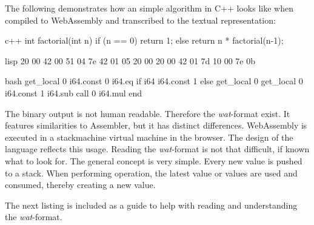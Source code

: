 The following demonstrates how an simple algorithm in C++ looks like when compiled to WebAssembly and transcribed to the textual representation:
\begin{listing}
\noindent
\begin{minipage}[t]{0.49\textwidth}
\begin{code}[]{c++}
int factorial(int n) {
  if (n == 0)
    return 1;
  else
    return n * factorial(n-1);
}
\end{code}
\end{minipage}
\begin{minipage}[t]{0.24\textwidth}
\begin{code}[]{lisp}
20 00
42 00
51
04 7e
42 01
05
20 00
20 00
42 01
7d
10 00
7e
0b
\end{code}
\end{minipage}
\begin{minipage}[t]{0.25\textwidth}
\begin{code}[]{bash}
get_local 0
i64.const 0
i64.eq
if i64
    i64.const 1
else
    get_local 0
    get_local 0
    i64.const 1
    i64.sub
    call 0
    i64.mul
end
\end{code}
\end{minipage}
\caption{C++ source code - Wasm format - Wat format \cite{wasm:wat}}
\label{lst:wasm-code}
\end{listing}

The binary output is not human readable. Therefore the \textit{wat}-format exist. It features similarities to Assembler, but it has distinct differences. WebAssembly is executed in a \gls{stackmachine} virtual machine in the browser. The design of the language reflects this usage. Reading the \textit{wat}-format is not that difficult, if known what to look for. The general concept is very simple. Every new value is pushed to a stack. When performing operation, the latest value or values are used and consumed, thereby creating a new value. 

\newpage

The next listing is included as a guide to help with reading and understanding the \textit{wat}-format.


